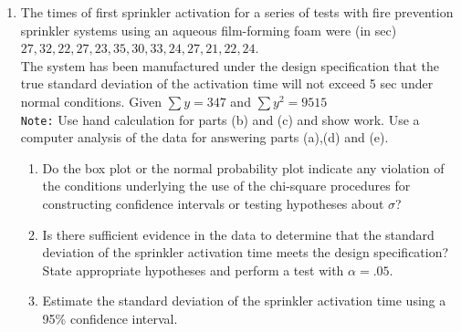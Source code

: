 \documentclass[11pt]{article}
\begin{document}
\begin{enumerate}
\begin{enumerate}
\newpage
\item
Use a 95\% confidence interval to estimate the difference in mean blood pressure in the two positions. 
Test the hypothesis in part (b) using this
interval stating the $\alpha$ level used for this test clearly.
State your conclusion.\\[2in]

\item Extract the t-statistic from the your output for testing the
hypothesis you stated in part (b). 
State the p-value associated with this test extracted from the output.\\[.8in]

\item  Extract the  95\% confidence interval for the  difference in mean blood pressure in the two positions  from the output. 
\\[.8in]

\end{enumerate}

\item The times of first sprinkler activation for a series of tests
with fire prevention sprinkler systems using an aqueous film-forming
foam were (in sec)
$ 27, 32, 22, 27, 23, 35, 30, 33, 24, 27, 21, 22, 24 $.\\
The system has been manufactured under the design specification 
that the true standard deviation of the activation time will not  exceed 5 sec under 
normal conditions. Given $\sum{y}=347$ and $\sum{y^2}=9515$\\
{\tt Note:}  Use hand calculation for parts (b) and (c) and show
work. Use a computer analysis of the data for answering parts (a),(d) and (e).


\begin{enumerate}
\item Do the box plot or the normal probability plot indicate any violation of the conditions
underlying the use of the chi-square procedures for constructing
confidence intervals or testing hypotheses about $\sigma$?
\newpage
\item  Is there sufficient evidence in the data to determine that the standard deviation of the sprinkler activation time meets the design specification? State appropriate hypotheses and perform a test with $\alpha=.05$.\\[2in]

\item Estimate the standard deviation  of the sprinkler activation time
using a 95\% confidence interval.\\[2in]



\end{enumerate}
\end{enumerate}
\end{document}
